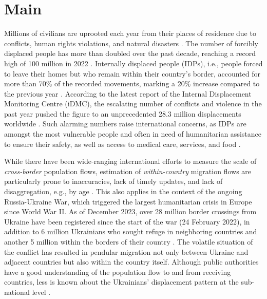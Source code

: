 \documentclass[sn-basic]{sn-jnl}%
\begin{document}


\section{Main}\label{Introduction}

Millions of civilians are uprooted each year from their places of residence due to conflicts, human rights violations, and natural disasters \citep{UNHCR_2022}. The number of forcibly displaced people has more than doubled over the past decade, reaching a record high of 100 million in 2022 \citep{UNHCR_2022_news}. Internally displaced people (IDPs), i.e., people forced to leave their homes but who remain within their country's border, accounted for more than 70\% of the recorded movements, marking a 20\% increase compared to the previous year \citep{IDMC_2023}. According to the latest report of the Internal Displacement Monitoring Centre (iDMC), the escalating number of conflicts and violence in the past year pushed the figure to an unprecedented 28.3 million displacements worldwide \citep{IDMC_2023}. Such alarming numbers raise international concerns, as IDPs are amongst the most vulnerable people and often in need of humanitarian assistance to ensure their safety, as well as access to medical care, services, and food \citep{UNHCR_2022}. 

While there have been wide-ranging international efforts to measure the scale of \emph{cross-border} population flows, estimation of \emph{within-country} migration flows are particularly prone to inaccuracies, lack of timely updates, and lack of disaggregation, e.g., by age \citep{Checchi_et_al_2017, Ratnayake_et_al_2022}. This also applies in the context of the ongoing Russia-Ukraine War, which triggered the largest humanitarian crisis in Europe since World War II. As of December 2023, over 28 million border crossings from Ukraine have been registered since the start of the war (24 February 2022), in addition to 6 million Ukrainians who sought refuge in neighboring countries and another 5 million within the borders of their country \citep{UNHCR_2023, IOM_2023}. The volatile situation of the conflict has resulted in pendular migration not only between Ukraine and adjacent countries but also within the country itself. Although public authorities have a good understanding of the population flow to and from receiving countries, less is known about the Ukrainians' displacement pattern at the sub-national level \citep{Rowe_et_al_2022}. 
\end{document}

